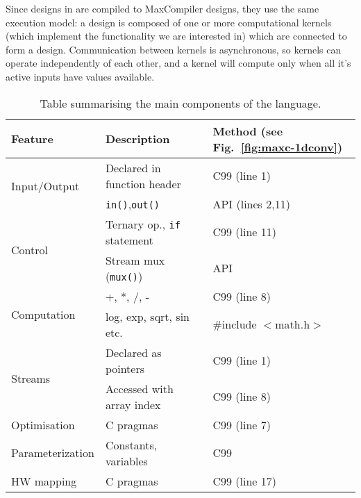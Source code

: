 Since designs in \MAXC{} are compiled to MaxCompiler designs, they
use the same execution model: a design is composed of one or more
computational kernels (which implement the functionality we are
interested in) which are connected to form a design. Communication
between kernels is asynchronous, so kernels can operate independently
of each other, and a kernel will compute only when all it's active
inputs have values available.

\begin{table}[!h]
  \centering
\renewcommand{\arraystretch}{1.2}
\caption{Table summarising the main components of the \MAXC{} language.}
\label{table:maxc-features}
\begin{tabular}{l|l|l}
\hline
\bf{Feature}                   & \bf{Description}                   & \bf{Method (see Fig.~\ref{fig:maxc-1dconv})} \\
\hline\hline
  \multirow{2}{*}{Input/Output}         & Declared in function header          & C99 (line 1)                                 \\\cline{2-3}       & \texttt{in()},\texttt{out()}  & \MAXC{} API (lines 2,11) \\
\hline
  \multirow{2}{*}{Control}     & Ternary op., \texttt{if} statement & C99 (line 11)                                \\\cline{2-3}      & Stream mux (\texttt{mux()})       & \MAXC{} API  \\
\hline
\multirow{2}{*}{Computation} & +, *, /, -                         & C99 (line 8)                           \\\cline{2-3} & log, exp, sqrt, sin etc.  & \#include $<$math.h$>$  \\
\hline
  \multirow{2}{*}{Streams}     & Declared as pointers               & C99 (line 1)                                 \\\cline{2-3}       & Accessed with array index & C99 (line 8) \\
\hline
  Optimisation                 & C pragmas                   & C99 (line 7)                                 \\
\hline
  Parameterization             & Constants, variables                   & C99                                          \\
\hline
HW mapping                  & C pragmas                   & C99 (line 17)                                \\
\end{tabular}
\vspace{-0.4cm}
\end{table}

